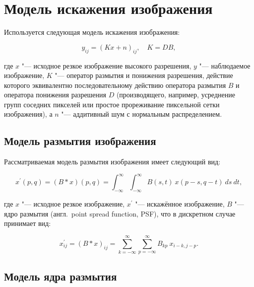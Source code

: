 \section{Модель искажения изображения}

Используется следующая модель искажения изображения:

\begin{equation*}
	y_{ij} = \left(Kx+n\right)_{ij},\quad K=DB,
\end{equation*}

\noindent где $x$ "--- исходное резкое изображение высокого разрешения, $y$ "--- наблюдаемое изображение, $K$ "--- оператор размытия и понижения разрешения, действие которого эквивалентно последовательному действию оператора размытия $B$ и оператора понижения разрешения $D$ (производящего, например, усреднение групп соседних пикселей или простое прореживание пиксельной сетки изображения), а $n$ "--- аддитивный шум с нормальным распределением.

\subsection{Модель размытия изображения} \label{sec:image-blur-model}

Рассматриваемая модель размытия изображения имеет следующий вид:

\begin{equation*}
	x^\prime \left(p, q\right) = \left(B \ast x\right) \left(p, q\right) = \int_{-\infty}^{\infty}\int_{-\infty}^{\infty}{B\left(s,t\right)\ x\left(p-s,q-t\right)\ ds\ dt},
\end{equation*}

\noindent где $x$ "--- исходное резкое изображение, $x^\prime$ "--- искажённое изображение, $B$ "--- ядро размытия (англ.~point spread function, PSF), что в дискретном случае принимает вид:

\begin{equation*}
	x^\prime_{ij} = \left(B \ast x\right)_{ij} = \sum_{k=-\infty}^{\infty} \sum_{p=-\infty}^{\infty}{B_{kp}\ x_{i-k,j-p}}.
\end{equation*}

\subsection{Модель ядра размытия} \label{sec:microscope-psf}

